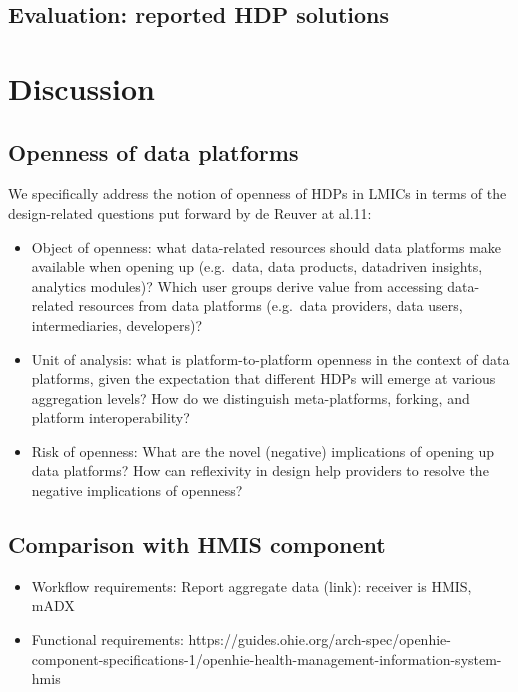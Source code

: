 \documentclass[
  authoryear]{elsarticle}
\providecommand{\tightlist}{%
  \setlength{\itemsep}{0pt}\setlength{\parskip}{0pt}}\usepackage{longtable,booktabs,array}
\begin{document}
\subsection{Evaluation: reported HDP
solutions}\label{evaluation-reported-hdp-solutions}

\section{Discussion}\label{discussion}

\subsection{Openness of data
platforms}\label{openness-of-data-platforms}

We specifically address the notion of openness of HDPs in LMICs in terms
of the design-related questions put forward by de Reuver at al.11:

\begin{itemize}
\tightlist
\item
  Object of openness: what data-related resources should data platforms
  make available when opening up (e.g.~data, data products, datadriven
  insights, analytics modules)? Which user groups derive value from
  accessing data-related resources from data platforms (e.g.~data
  providers, data users, intermediaries, developers)?
\item
  Unit of analysis: what is platform-to-platform openness in the context
  of data platforms, given the expectation that different HDPs will
  emerge at various aggregation levels? How do we distinguish
  meta-platforms, forking, and platform interoperability?
\item
  Risk of openness: What are the novel (negative) implications of
  opening up data platforms? How can reflexivity in design help
  providers to resolve the negative implications of openness?
\end{itemize}

\subsection{Comparison with HMIS
component}\label{comparison-with-hmis-component}

\begin{itemize}
\tightlist
\item
  Workflow requirements: Report aggregate data (link): receiver is HMIS,
  mADX
\item
  Functional requirements:
  https://guides.ohie.org/arch-spec/openhie-component-specifications-1/openhie-health-management-information-system-hmis
\end{itemize}
\end{document}
